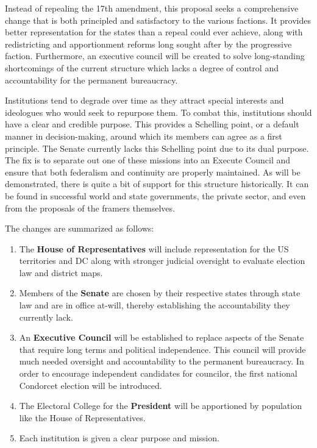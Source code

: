 \documentclass{article}
\begin{document}
Instead of repealing the 17th amendment, this proposal seeks a comprehensive change that is both principled and satisfactory to the various factions. It provides better representation for the states than a repeal could ever achieve, along with redistricting and apportionment reforms long sought after by the progressive faction. Furthermore, an executive council will be created to solve long-standing shortcomings of the current structure which lacks a degree of control and accountability for the permanent bureaucracy.

Institutions tend to degrade over time as they attract special interests and ideologues who would seek to repurpose them. To combat this, institutions should have a clear and credible purpose. This provides a Schelling point, or a default manner in decision-making, around which its members can agree as a first principle\cite{Komoroske}. The Senate currently lacks this Schelling point due to its dual purpose. The fix is to separate out one of these missions into an Execute Council and ensure that both federalism and continuity are properly maintained. As will be demonstrated, there is quite a bit of support for this structure historically. It can be found in successful world and state governments, the private sector, and even from the proposals of the framers themselves.

The changes are summarized as follows:
\begin{enumerate}
  \item The \textbf{House of Representatives} will include representation for the US territories and DC along with stronger judicial oversight to evaluate election law and district maps.
  \item Members of the \textbf{Senate} are chosen by their respective states through state law and are in office at-will, thereby establishing the accountability they currently lack.
  \item An \textbf{Executive Council} will be established to replace aspects of the Senate that require long terms and political independence. This council will provide much needed oversight and accountability to the permanent bureaucracy. In order to encourage independent candidates for councilor, the first national Condorcet election will be introduced.
  \item The Electoral College for the \textbf{President} will be apportioned by population like the House of Representatives.
 \item Each institution is given a clear purpose and mission.
\end{enumerate}
\end{document}
